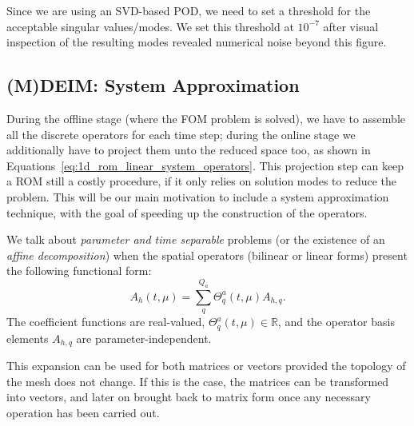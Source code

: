 \documentclass[../../thesis.tex]{subfiles}
\begin{document}
Since we are using an SVD-based POD, we need to set a threshold for
the acceptable singular values/modes.
We set this threshold at $10^{-7}$
after visual inspection of the resulting modes revealed
numerical noise beyond this figure.


\subsection{(M)DEIM: System Approximation}
\label{sec:1d_rom_burgers_system_approximation_deim}
During the offline stage (where the FOM problem is solved), 
we have to assemble all the discrete operators for each time step;
during the online stage we additionally have to project them unto the reduced space too, as shown in Equations~\eqref{eq:1d_rom_linear_system_operators}.
This projection step can keep a ROM still a costly procedure,
if it only relies on solution modes to reduce the problem.
This will be our main motivation to include a system approximation technique,
with the goal of speeding up the construction of the operators.

We talk about \emph{parameter and time separable} problems 
(or the existence of an \emph{affine decomposition})
when the spatial operators (bilinear or linear forms)
present the following functional form:
\begin{equation}
    \label{eq:1d_rom_burgers_separable_form_time_param}
    A_h(t, \mu) = \sum_q^{Q_a} \Theta_q^a(t, \mu) A_{h,q}.
\end{equation}
The coefficient functions are real-valued, \mbox{$\Theta_q^a(t, \mu) \in \mathbb{R}$}, 
and the operator basis elements $A_{h,q}$ are parameter-independent.

This expansion can be used for both matrices or vectors provided 
the topology of the mesh does not change.
If this is the case, the matrices can be transformed into vectors, 
and later on brought back to matrix form once any necessary operation has been carried out.
\end{document}

